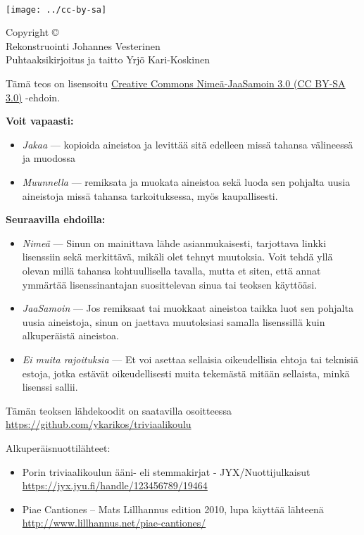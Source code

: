 \newpage
~\vfill
\thispagestyle{empty}
\setlength{\parindent}{0pt}
\setlength{\parskip}{\baselineskip}

\texttt{[image: ../cc-by-sa]}

Copyright \copyright\ \the\year \\
Rekonstruointi Johannes Vesterinen \\
Puhtaaksikirjoitus ja taitto Yrjö Kari-Koskinen

Tämä teos on lisensoitu \href{https://creativecommons.org/licenses/by-sa/3.0/deed.fi}{Creative Commons Nimeä-JaaSamoin 3.0 (\textsc{CC BY-SA 3.0})} -ehdoin.

\textbf{Voit vapaasti:}
\begin{itemize}
	\item \emph{Jakaa} — kopioida aineistoa ja levittää sitä edelleen missä tahansa välineessä ja muodossa
	\item \emph{Muunnella} — remiksata ja muokata aineistoa sekä luoda sen pohjalta uusia aineistoja missä tahansa tarkoituksessa, myös kaupallisesti.
\end{itemize}

\textbf{Seuraavilla ehdoilla:}
\begin{itemize}

	\item \emph{Nimeä} — Sinun on mainittava lähde asianmukaisesti, tarjottava linkki lisenssiin sekä merkittävä, mikäli olet tehnyt muutoksia. Voit tehdä yllä olevan millä tahansa kohtuullisella tavalla, mutta et siten, että annat ymmärtää lisenssinantajan suosittelevan sinua tai teoksen käyttöäsi.

	\item \emph{JaaSamoin} — Jos remiksaat tai muokkaat aineistoa taikka luot sen pohjalta uusia aineistoja, sinun on jaettava muutoksiasi samalla lisenssillä kuin alkuperäistä aineistoa.

	\item \emph{Ei muita rajoituksia} — Et voi asettaa sellaisia oikeudellisia ehtoja tai teknisiä estoja, jotka estävät oikeudellisesti muita tekemästä mitään sellaista, minkä lisenssi sallii.
\end{itemize}

Tämän teoksen lähdekoodit on saatavilla osoitteessa \url{https://github.com/ykarikos/triviaalikoulu}

Alkuperäisnuottilähteet:
\begin{itemize}
\item Porin triviaalikoulun ääni- eli stemmakirjat - JYX/Nuottijulkaisut \\ \url{https://jyx.jyu.fi/handle/123456789/19464}
\item Piae Cantiones – Mats Lillhannus edition 2010, lupa käyttää lähteenä \\ \url{http://www.lillhannus.net/piae-cantiones/} 
\end{itemize}


